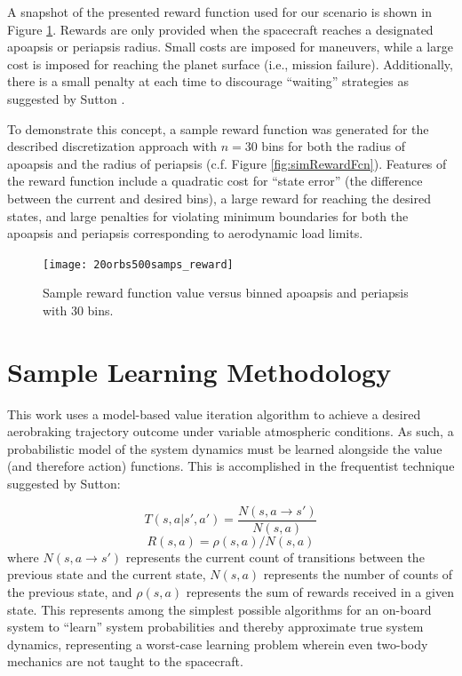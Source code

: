\documentclass[paper,11pt]{AAS}		%
\begin{document}
A snapshot of the presented reward function used for our scenario is shown in Figure \ref{fig:simRewardFunction}. Rewards are only provided when the spacecraft reaches a designated apoapsis or periapsis radius. Small costs are imposed for maneuvers, while a large cost is imposed for reaching the planet surface (i.e., mission failure). Additionally, there is a small penalty at each time to discourage ``waiting'' strategies as suggested by Sutton \cite{Sutton2012}. 

To demonstrate this concept, a sample reward function was generated for the described discretization approach with $n=30$ bins for both the radius of apoapsis and the radius of periapsis (c.f. Figure \ref{fig:simRewardFcn}). Features of the reward function include a quadratic cost for ``state error'' (the difference between the current and desired bins), a large reward for reaching the desired states, and large penalties for violating minimum boundaries for both the apoapsis and periapsis corresponding to aerodynamic load limits. 

\begin{figure}[H]
	\centering
	\texttt{[image: 20orbs500samps\_reward]}
	\caption{Sample reward function value versus binned apoapsis and periapsis with 30 bins.}
	\label{fig:simRewardFunction}
\end{figure}

\section{Sample Learning Methodology}
\label{sec:learningMethod}
This work uses a model-based value iteration algorithm to achieve a desired aerobraking trajectory outcome under variable atmospheric conditions. As such, a probabilistic model of the system dynamics must be learned alongside the value (and therefore action) functions. This is accomplished in the frequentist technique suggested by Sutton\cite{Sutton2012}:

\begin{equation}
T(s,a | s',a') = \frac{N(s, a \rightarrow s')}{N(s,a)}
\end{equation}
\begin{equation}
R(s,a) = \rho(s,a)/N(s,a)
\end{equation}
where $N(s, a \rightarrow s')$ represents the current count of transitions between the previous state and the current state, $N(s,a)$ represents  the number of counts of the previous state, and $\rho(s,a)$ represents the sum of rewards received in a given state. This represents among the simplest possible algorithms for an on-board system to ``learn'' system probabilities and thereby approximate true system dynamics, representing a worst-case learning problem wherein even two-body mechanics are not taught to the spacecraft. 
\end{document}
